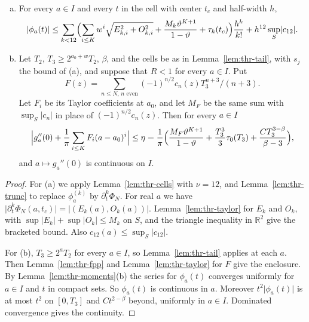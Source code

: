 \begin{proposition}\label{prop:thr-interval}
\begin{enumerate}[(a)]
\item For every $a\in I$ and every $t$ in the cell with center $t_c$ and
half-width $h$,
\[
 \lvert\phi_a(t)\rvert\le\sum_{k<12}\Bigl(\sum_{i\le K}w^i
 \sqrt{E_{k,i}^2+O_{k,i}^2}+\frac{M_k\vartheta^{K+1}}{1-\vartheta}+\tau_k(t_c)\Bigr)
 \frac{h^k}{k!}+h^{12}\sup_S\lvert c_{12}\rvert .
\]
\item Let $T_2$, $T_3\ge2^{a_0+w}T_2$, $\beta$, and the cells be as in
Lemma~\ref{lem:thr-tail}, with $s_j$ the bound of (a), and suppose that $R<1$
for every $a\in I$. Put
\[
 F(z)=\sum_{n\le N,\,n\text{ even}}(-1)^{n/2}c_n(z)T_3^{n+3}/(n+3).
\]
Let $F_i$ be its Taylor coefficients at $a_0$, and let $M_F$ be
the same sum with $\sup_S\lvert c_n\rvert$ in place of $(-1)^{n/2}c_n(z)$. Then
for every $a\in I$
\[
 \Bigl\lvert g_a''(0)+\frac1\pi\sum_{i\le K}F_i(a-a_0)^i\Bigr\rvert\le\eta
 =\frac1\pi\Bigl(\frac{M_F\vartheta^{K+1}}{1-\vartheta}+\frac{T_3^3}3\tau_0(T_3)
 +\frac{CT_3^{3-\beta}}{\beta-3}\Bigr),
\]
and $a\mapsto g_a''(0)$ is continuous on $I$.
\end{enumerate}
\end{proposition}

\begin{proof}
For (a) we apply Lemma~\ref{lem:thr-cells} with $\nu=12$, and
Lemma~\ref{lem:thr-trunc} to replace $\phi_a^{(k)}$ by $\partial_t^k\Phi_N$.
For real $a$ we have
$\lvert\partial_t^k\Phi_N(a,t_c)\rvert=\lvert(E_k(a),O_k(a))\rvert$.
Lemma~\ref{lem:thr-taylor} for $E_k$ and $O_k$, with
$\sup\lvert E_k\rvert+\sup\lvert O_k\rvert\le M_k$ on $S$, and the triangle
inequality in $\mathbb R^2$ give the bracketed bound. Also
$c_{12}(a)\le\sup_S\lvert c_{12}\rvert$.

For (b), $T_3\ge2^aT_2$ for every $a\in I$, so Lemma~\ref{lem:thr-tail} applies
at each $a$. Then Lemma~\ref{lem:thr-fpp} and Lemma~\ref{lem:thr-taylor} for
$F$ give the enclosure. By Lemma~\ref{lem:thr-moments}(b) the series for
$\phi_a(t)$ converges uniformly for $a\in I$ and $t$ in compact sets. So
$\phi_a(t)$ is continuous in $a$. Moreover $t^2\lvert\phi_a(t)\rvert$ is at
most $t^2$ on $[0,T_3]$ and $Ct^{2-\beta}$ beyond, uniformly in $a\in I$.
Dominated convergence gives the continuity.
\end{proof}


